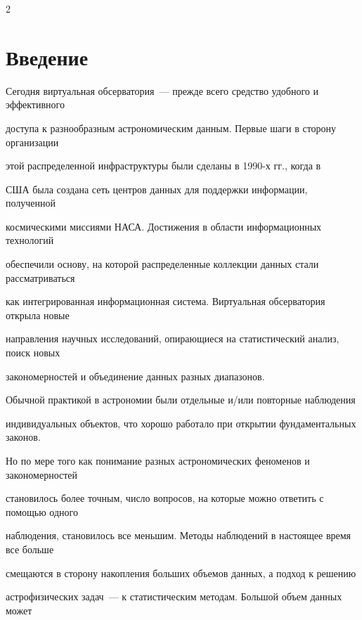       \thispagestyle{headings}



      \begin{multicols}{2}



            \label{st\stat}



\section{Введение}

        

      Сегодня виртуальная обсерватория~--- прежде всего средство удобного и эффективного 

доступа к разнообразным астрономическим данным. Первые шаги в сторону организации 

этой распределенной инфраструктуры были сделаны в 1990-х гг., когда в 

США была создана сеть центров данных для поддержки информации, полученной 

космическими миссиями НАСА. Достижения в области информационных технологий 

обеспечили основу, на которой распределенные коллекции данных стали рассматриваться 

как интегрированная информационная система. Виртуальная обсерватория открыла новые 

направления научных исследований, опирающиеся на статистический анализ, поиск новых 

закономерностей и объединение данных разных диапазонов.

      

      Обычной практикой в астрономии были отдельные и/или повторные наблюдения 

индивидуальных объектов, что хорошо работало при открытии фундаментальных законов. 

Но по мере того как понимание разных астрономических феноменов и закономерностей 

становилось более точным, чис\-ло вопросов, на которые можно ответить с по\-мощью одного 

наблюдения, становилось все меньшим. Методы наблюдений в настоящее время все больше 

смещаются в сторону накопления больших объемов данных, а подход к решению 

астрофизических задач~--- к статистическим методам. Большой объем данных может 


\end{multicols}
